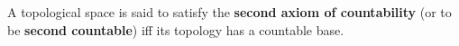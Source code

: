 A topological space is said to satisfy the \textbf{second axiom of countability} (or to be \textbf{second countable}) iff its topology has a countable base.
